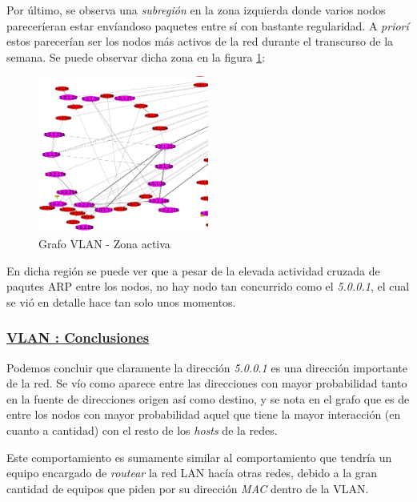 \par Por \'ultimo, se observa una \textit{subregi\'on} en la zona izquierda donde varios
nodos parecer\'ieran estar env\'iandoso paquetes entre s\'i con bastante regularidad. A
\textit{prior\'i} estos parecer\'ian ser los nodos m\'as activos de la red durante el
transcurso de la semana. Se puede observar dicha zona en la figura \ref{fig:vlan10_grafo_inf}:

\begin{figure}
    \centering
    \includegraphics[width=0.5\textwidth]{img/graph/escenario_1/vlan10/vlan10_500toEnd_inf}
    \caption{Grafo VLAN  - Zona activa}
    \label{fig:vlan10_grafo_inf}
\end{figure}

\par En dicha regi\'on se puede ver que a pesar de la elevada actividad cruzada de paqutes
ARP entre los nodos, no hay nodo tan concurrido como el \textit{5.0.0.1}, el cual se
vi\'o en detalle hace tan solo unos momentos.


\subsubsection*{\underline{VLAN : Conclusiones}}\label{subsubsec:vlan10_conclusiones}
\par Podemos concluir que claramente la direcci\'on \textit{5.0.0.1} es una
direcci\'on importante de la red. Se v\'io como aparece entre las direcciones con mayor
probabilidad tanto en la fuente de direcciones origen as\'i como destino, y se nota
en el grafo que es de entre los nodos con mayor probabilidad aquel que tiene la mayor
interacci\'on (en cuanto a cantidad) con el resto de los \textit{hosts} de la redes.

\par Este comportamiento es sumamente similar al comportamiento que tendr\'ia un equipo
encargado de \textit{routear} la red LAN hac\'ia otras redes, debido a la gran cantidad
de equipos que piden por su direcci\'on \textit{MAC} dentro de la VLAN.

